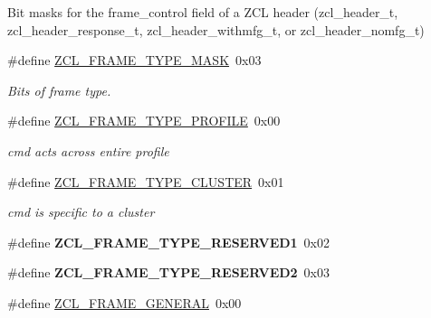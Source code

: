 Bit masks for the frame\-\_\-control field of a Z\-C\-L header (zcl\-\_\-header\-\_\-t, zcl\-\_\-header\-\_\-response\-\_\-t, zcl\-\_\-header\-\_\-withmfg\-\_\-t, or zcl\-\_\-header\-\_\-nomfg\-\_\-t) \begin{DoxyCompactItemize}
\item 
\hypertarget{group__zcl_gad2e6a61d29cd303e906699a49fa2eb8e}{\#define \hyperlink{group__zcl_gad2e6a61d29cd303e906699a49fa2eb8e}{Z\-C\-L\-\_\-\-F\-R\-A\-M\-E\-\_\-\-T\-Y\-P\-E\-\_\-\-M\-A\-S\-K}~0x03}\label{group__zcl_gad2e6a61d29cd303e906699a49fa2eb8e}

\begin{DoxyCompactList}\small\item\em Bits of frame type. \end{DoxyCompactList}\item 
\hypertarget{group__zcl_ga332a452ea08eb67a3ebf962320bf8819}{\#define \hyperlink{group__zcl_ga332a452ea08eb67a3ebf962320bf8819}{Z\-C\-L\-\_\-\-F\-R\-A\-M\-E\-\_\-\-T\-Y\-P\-E\-\_\-\-P\-R\-O\-F\-I\-L\-E}~0x00}\label{group__zcl_ga332a452ea08eb67a3ebf962320bf8819}

\begin{DoxyCompactList}\small\item\em cmd acts across entire profile \end{DoxyCompactList}\item 
\hypertarget{group__zcl_ga75efeedff171558e183dbf8d646ea5dd}{\#define \hyperlink{group__zcl_ga75efeedff171558e183dbf8d646ea5dd}{Z\-C\-L\-\_\-\-F\-R\-A\-M\-E\-\_\-\-T\-Y\-P\-E\-\_\-\-C\-L\-U\-S\-T\-E\-R}~0x01}\label{group__zcl_ga75efeedff171558e183dbf8d646ea5dd}

\begin{DoxyCompactList}\small\item\em cmd is specific to a cluster \end{DoxyCompactList}\item 
\hypertarget{group__zcl_ga8b924ad81837f99ce23adb416f888cba}{\#define {\bfseries Z\-C\-L\-\_\-\-F\-R\-A\-M\-E\-\_\-\-T\-Y\-P\-E\-\_\-\-R\-E\-S\-E\-R\-V\-E\-D1}~0x02}\label{group__zcl_ga8b924ad81837f99ce23adb416f888cba}

\item 
\hypertarget{group__zcl_gadd2b5e079220ed32284b8e188d34d613}{\#define {\bfseries Z\-C\-L\-\_\-\-F\-R\-A\-M\-E\-\_\-\-T\-Y\-P\-E\-\_\-\-R\-E\-S\-E\-R\-V\-E\-D2}~0x03}\label{group__zcl_gadd2b5e079220ed32284b8e188d34d613}

\item 
\hypertarget{group__zcl_ga09fb05e268f791031acb037c9b5df555}{\#define \hyperlink{group__zcl_ga09fb05e268f791031acb037c9b5df555}{Z\-C\-L\-\_\-\-F\-R\-A\-M\-E\-\_\-\-G\-E\-N\-E\-R\-A\-L}~0x00}\label{group__zcl_ga09fb05e268f791031acb037c9b5df555}


\end{DoxyCompactItemize}
